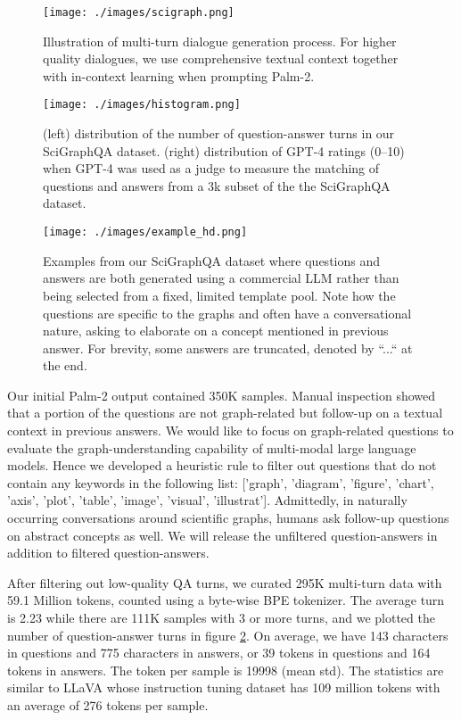 \documentclass{article}
\begin{document}
\begin{figure}[!htbp]
\centering
\texttt{[image: ./images/scigraph.png]}
\caption{Illustration of multi-turn dialogue generation process. For higher quality dialogues, we use comprehensive textual context together with in-context learning when prompting Palm-2.}
\label{fig:questionanswer_generation_process_flow_palm2}
\end{figure}

\begin{figure}[!htbp]
\centering
\texttt{[image: ./images/histogram.png]}
\caption{(left) distribution of the number of question-answer turns in our SciGraphQA dataset. (right) distribution of GPT-4 ratings (0--10) when GPT-4 was used as a judge to measure the matching of questions and answers from a 3k subset of the the SciGraphQA dataset.}
\label{fig:gpt4_rating_distribution_histogram_gpt4}
\end{figure}

\begin{figure}[!htbp]
\centering
\texttt{[image: ./images/example\_hd.png]}
\caption{Examples from our SciGraphQA dataset where questions and answers are both generated using a commercial LLM rather than being selected from a fixed, limited template pool. Note how the questions are specific to the graphs and often have a conversational nature, asking to elaborate on a concept mentioned in previous answer. For brevity, some answers are truncated, denoted by ``...`` at the end.}
\label{fig:datasetexamples}
\end{figure}

Our initial Palm-2 output contained 350K samples. Manual inspection showed that a portion of the questions are not graph-related but follow-up on a textual context in previous answers. We would like to focus on graph-related questions to evaluate the graph-understanding capability of multi-modal large language models. Hence we developed a heuristic rule to filter out questions that do not contain any keywords in the following list: ['graph', 'diagram', 'figure', 'chart', 'axis', 'plot', 'table', 'image', 'visual', 'illustrat'].  Admittedly, in naturally occurring conversations around scientific graphs, humans ask follow-up questions on abstract concepts as well. We will release the unfiltered question-answers in addition to filtered question-answers. 

After filtering out low-quality QA turns, we curated 295K multi-turn data with 59.1 Million tokens, counted using a byte-wise BPE tokenizer. The average turn is 2.23 while there are 111K samples with 3 or more turns, and we plotted the number of question-answer turns in figure \ref{fig:gpt4_rating_distribution_histogram_gpt4}. On average, we have 143 characters in questions and 775 characters in answers, or 39 tokens in questions and 164 tokens in answers. The token per sample is 19998 (mean  std). The statistics are similar to LLaVA whose instruction tuning dataset has 109 million tokens with an average of 276 tokens per sample.
\end{document}
